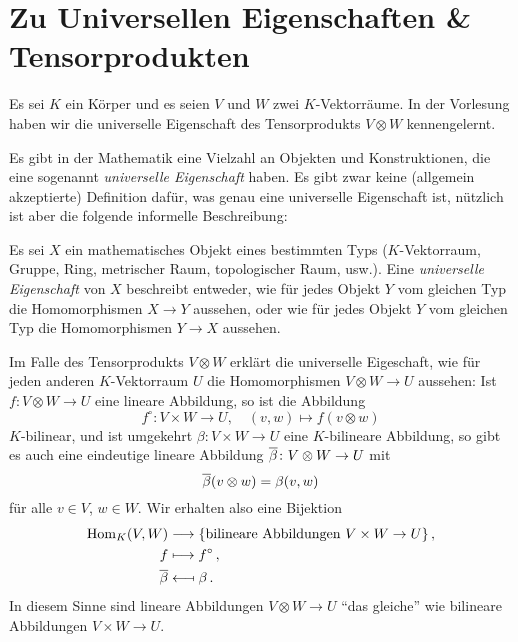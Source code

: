 \section*{Zu Universellen Eigenschaften \& Tensorprodukten}

Es sei $K$ ein Körper und es seien $V$ und $W$ zwei $K$-Vektorräume.
In der Vorlesung haben wir die universelle Eigenschaft des Tensorprodukts $V \otimes W$ kennengelernt.

Es gibt in der Mathematik eine Vielzahl an Objekten und Konstruktionen, die eine sogenannt \emph{universelle Eigenschaft} haben.
Es gibt zwar keine (allgemein akzeptierte) Definition dafür, was genau eine universelle Eigenschaft ist, nützlich ist aber die folgende informelle Beschreibung:
 
\begin{idea}
  \label{idea: universal properties}
  Es sei $X$ ein mathematisches Objekt eines bestimmten Typs ($K$-Vektorraum, Gruppe, Ring, metrischer Raum, topologischer Raum, usw.).
  Eine \emph{universelle Eigenschaft} von $X$ beschreibt entweder, wie für jedes Objekt $Y$ vom gleichen Typ die Homomorphismen $X \to Y$ aussehen, oder wie für jedes Objekt $Y$ vom gleichen Typ die Homomorphismen $Y \to X$ aussehen.
\end{idea}

Im Falle des Tensorprodukts $V \otimes W$ erklärt die universelle Eigeschaft, wie für jeden anderen $K$-Vektorraum $U$ die Homomorphismen $V \otimes W \to U$ aussehen:
Ist $f \colon V \otimes W \to U$ eine lineare Abbildung, so ist die Abbildung
\[
          f^\circ
  \colon  V \times W
  \to     U,
  \quad   (v,w)
  \mapsto f(v \otimes w)
\]
$K$-bilinear, und ist umgekehrt $\beta \colon V \times W \to U$ eine $K$-bilineare Abbildung, so gibt es auch eine eindeutige lineare Abbildung $\overline{\beta} \colon V \otimes W \to U$ mit
\[
    \overline{\beta}(v \otimes w)
  = \beta(v,w)
\]
für alle $v \in V$, $w \in W$.
Wir erhalten also eine Bijektion
\begin{align*}
                    \operatorname{Hom}_K(V,W)
  &\longrightarrow  \{ \text{bilineare Abbildungen $V \times W \to U$} \} \,,
  \\
                    f
  &\longmapsto      f^\circ \,,
  \\
                    \overline{\beta}
  &\longmapsfrom    \beta \,.
\end{align*}
In diesem Sinne sind lineare Abbildungen $V \otimes W \to U$ \enquote{das gleiche} wie bilineare Abbildungen $V \times W \to U$.


